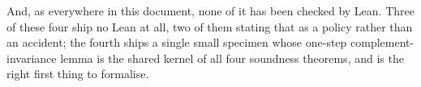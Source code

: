 And, as everywhere in this document, none of it has been checked by Lean. Three
of these four ship no Lean at all, two of them stating that as a policy rather
than an accident; the fourth ships a single small specimen whose one-step
complement-invariance lemma is the shared kernel of all four soundness
theorems, and is the right first thing to formalise.
